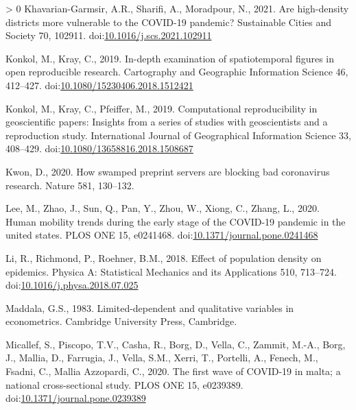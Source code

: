 \documentclass[]{elsarticle} %
\newlength{\cslhangindent}
\newenvironment{CSLReferences}[3] %
 {%
  \setlength{\parindent}{0pt}
  \ifodd #1 \everypar{\setlength{\hangindent}{\cslhangindent}}\ignorespaces\fi
  \ifnum #2 > 0
  \setlength{\parskip}{#2\baselineskip}
  \fi
 }%
 {}
\begin{document}
\begin{CSLReferences}{1}{0}
\leavevmode\hypertarget{ref-Khavarian2021high}{}%
Khavarian-Garmsir, A.R., Sharifi, A., Moradpour, N., 2021. Are
high-density districts more vulnerable to the COVID-19 pandemic?
Sustainable Cities and Society 70, 102911.
doi:\href{https://doi.org/10.1016/j.scs.2021.102911}{10.1016/j.scs.2021.102911}

\leavevmode\hypertarget{ref-Konkol2019examination}{}%
Konkol, M., Kray, C., 2019. In-depth examination of spatiotemporal
figures in open reproducible research. Cartography and Geographic
Information Science 46, 412--427.
doi:\href{https://doi.org/10.1080/15230406.2018.1512421}{10.1080/15230406.2018.1512421}

\leavevmode\hypertarget{ref-Konkol2019computational}{}%
Konkol, M., Kray, C., Pfeiffer, M., 2019. Computational reproducibility
in geoscientific papers: Insights from a series of studies with
geoscientists and a reproduction study. International Journal of
Geographical Information Science 33, 408--429.
doi:\href{https://doi.org/10.1080/13658816.2018.1508687}{10.1080/13658816.2018.1508687}

\leavevmode\hypertarget{ref-Kwon2021swamped}{}%
Kwon, D., 2020. How swamped preprint servers are blocking bad
coronavirus research. Nature 581, 130--132.

\leavevmode\hypertarget{ref-Lee2020human}{}%
Lee, M., Zhao, J., Sun, Q., Pan, Y., Zhou, W., Xiong, C., Zhang, L.,
2020. Human mobility trends during the early stage of the COVID-19
pandemic in the united states. PLOS ONE 15, e0241468.
doi:\href{https://doi.org/10.1371/journal.pone.0241468}{10.1371/journal.pone.0241468}

\leavevmode\hypertarget{ref-Li2018effect}{}%
Li, R., Richmond, P., Roehner, B.M., 2018. Effect of population density
on epidemics. Physica A: Statistical Mechanics and its Applications 510,
713--724.
doi:\href{https://doi.org/10.1016/j.physa.2018.07.025}{10.1016/j.physa.2018.07.025}

\leavevmode\hypertarget{ref-Maddala1983limited}{}%
Maddala, G.S., 1983. Limited-dependent and qualitative variables in
econometrics. Cambridge University Press, Cambridge.

\leavevmode\hypertarget{ref-Micallef2020first}{}%
Micallef, S., Piscopo, T.V., Casha, R., Borg, D., Vella, C., Zammit,
M.-A., Borg, J., Mallia, D., Farrugia, J., Vella, S.M., Xerri, T.,
Portelli, A., Fenech, M., Fsadni, C., Mallia Azzopardi, C., 2020. The
first wave of COVID-19 in malta; a national cross-sectional study. PLOS
ONE 15, e0239389.
doi:\href{https://doi.org/10.1371/journal.pone.0239389}{10.1371/journal.pone.0239389}


\end{CSLReferences}
\end{document}
